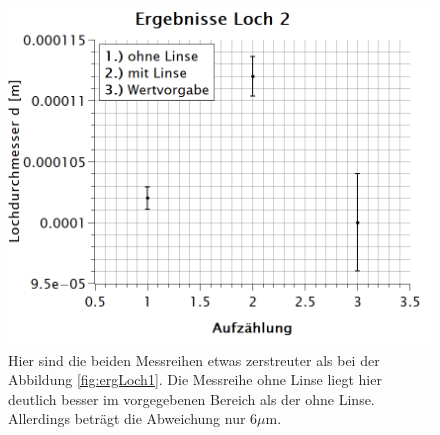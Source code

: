 \newpage
\begin{figure}
\centering
\includegraphics[width=\textwidth]{Bilder/ergebnisse_loch2.png} 
\caption[Ergebnisse Loch 2]{Hier sind die beiden Messreihen etwas zerstreuter als bei der Abbildung \ref{fig:ergLoch1}. Die Messreihe ohne Linse liegt hier deutlich besser im vorgegebenen Bereich als der ohne Linse. Allerdings beträgt die Abweichung nur 6$\mu$m.}
\label{fig:ergLoch2}
\end{figure}
\newpage